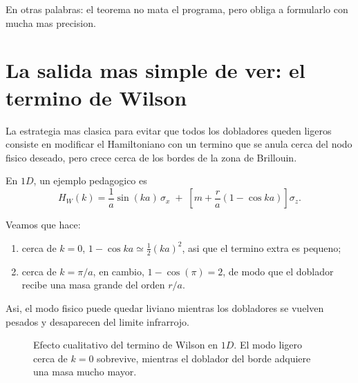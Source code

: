 En otras palabras: el teorema no mata el programa, pero obliga a formularlo con mucha mas precision.

\section{La salida mas simple de ver: el termino de Wilson}

La estrategia mas clasica para evitar que todos los dobladores queden ligeros consiste en modificar el Hamiltoniano con un termino que se anula cerca del nodo fisico deseado, pero crece cerca de los bordes de la zona de Brillouin.

En \(1D\), un ejemplo pedagogico es
\begin{equation}
H_W(k)=\frac{1}{a}\sin(ka)\,\sigma_x
\;+\;
\left[
m + \frac{r}{a}(1-\cos ka)
\right]\sigma_z.
\label{c26:eq:wilson-1d}
\end{equation}

Veamos que hace:

\begin{enumerate}[leftmargin=*]
  \item cerca de \(k=0\), \(1-\cos ka \simeq \tfrac{1}{2}(ka)^2\), asi que el termino extra es pequeno;
  \item cerca de \(k=\pi/a\), en cambio, \(1-\cos(\pi)=2\), de modo que el doblador recibe una masa grande del orden \(r/a\).
\end{enumerate}

Asi, el modo fisico puede quedar liviano mientras los dobladores se vuelven pesados y desaparecen del limite infrarrojo.

\begin{figure}[ht]
\centering
{}
\caption{Efecto cualitativo del termino de Wilson en \(1D\). El modo ligero cerca de \(k=0\) sobrevive, mientras el doblador del borde adquiere una masa mucho mayor.}
\label{c26:fig:wilson}
\end{figure}

